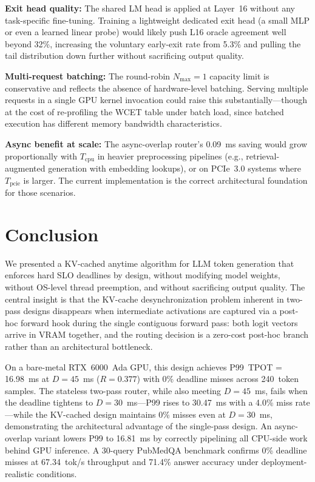 \documentclass[conference]{IEEEtran}
\begin{document}
\textbf{Exit head quality:}
The shared LM head is applied at Layer~16 without any task-specific
fine-tuning.
Training a lightweight dedicated exit head (a small MLP or even a
learned linear probe) would likely push L16 oracle agreement well beyond
32\%, increasing the voluntary early-exit rate from 5.3\% and pulling
the tail distribution down further without sacrificing output quality.

\textbf{Multi-request batching:}
The round-robin $N_{\max}=1$ capacity limit is conservative and reflects
the absence of hardware-level batching.
Serving multiple requests in a single GPU kernel invocation could raise
this substantially---though at the cost of re-profiling the WCET table
under batch load, since batched execution has different memory bandwidth
characteristics.

\textbf{Async benefit at scale:}
The async-overlap router's 0.09~ms saving would grow proportionally
with $T_{\text{cpu}}$ in heavier preprocessing pipelines (e.g.,
retrieval-augmented generation with embedding lookups), or on PCIe~3.0
systems where $T_{\text{pcie}}$ is larger.
The current implementation is the correct architectural foundation for
those scenarios.

\section{Conclusion}

We presented a KV-cached anytime algorithm for LLM token generation that
enforces hard SLO deadlines by design, without modifying model weights,
without OS-level thread preemption, and without sacrificing output quality.
The central insight is that the KV-cache desynchronization problem inherent
in two-pass designs disappears when intermediate activations are captured
via a post-hoc forward hook during the single contiguous forward pass:
both logit vectors arrive in VRAM together, and the routing decision is
a zero-cost post-hoc branch rather than an architectural bottleneck.

On a bare-metal RTX~6000~Ada GPU, this design achieves P99~TPOT = 16.98~ms
at $D=45$~ms ($R=0.377$) with 0\% deadline misses across 240~token samples.
The stateless two-pass router, while also meeting $D=45$~ms, fails when the
deadline tightens to $D=30$~ms---P99 rises to 30.47~ms with a 4.0\%
miss rate---while the KV-cached design maintains 0\% misses even at
$D=30$~ms, demonstrating the architectural advantage of the single-pass
design.
An async-overlap variant lowers P99 to 16.81~ms by correctly pipelining
all CPU-side work behind GPU inference.
A 30-query PubMedQA benchmark confirms 0\% deadline misses at
67.34~tok/s throughput and 71.4\% answer accuracy under deployment-realistic
conditions.
\end{document}
